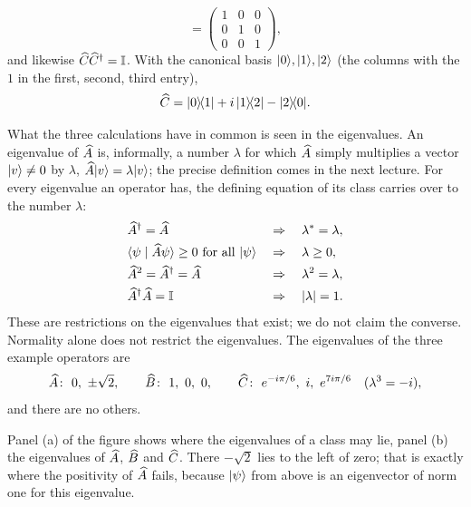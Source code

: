 \begin{example}
\begin{equation}
		= \begin{pmatrix} 1 & 0 & 0 \\ 0 & 1 & 0 \\ 0 & 0 & 1 \end{pmatrix},
	\end{equation}
	and likewise $\widehat{C}\widehat{C}^{\dagger} = \mathbb{I}$. With the canonical basis $\lvert 0 \rangle,\lvert 1 \rangle,\lvert 2 \rangle$ (the columns with the $1$ in the first, second, third entry),
	\begin{equation}
		\widehat{C} = \lvert 0 \rangle\!\langle 1 \rvert + i\,\lvert 1 \rangle\!\langle 2 \rvert - \lvert 2 \rangle\!\langle 0 \rvert.
	\end{equation}
\end{example}

What the three calculations have in common is seen in the eigenvalues. An eigenvalue of $\widehat{A}$ is, informally, a number $\lambda$ for which $\widehat{A}$ simply multiplies a vector $\lvert v \rangle \neq 0$ by $\lambda$, $\widehat{A}\lvert v \rangle = \lambda\lvert v \rangle$; the precise definition comes in the next lecture. For every eigenvalue an operator has, the defining equation of its class carries over to the number $\lambda$:
\begin{equation}
	\begin{aligned}
		&\widehat{A}^{\dagger} = \widehat{A} &&\Rightarrow\quad \lambda^* = \lambda, \\
		&\langle \psi \mid \widehat{A}\psi \rangle \geq 0 \text{ for all } \lvert \psi \rangle &&\Rightarrow\quad \lambda \geq 0, \\
		&\widehat{A}^2 = \widehat{A}^{\dagger} = \widehat{A} &&\Rightarrow\quad \lambda^2 = \lambda, \\
		&\widehat{A}^{\dagger}\widehat{A} = \mathbb{I} &&\Rightarrow\quad \left\lvert \lambda \right\rvert = 1.
	\end{aligned}
\end{equation}
These are restrictions on the eigenvalues that exist; we do not claim the converse. Normality alone does not restrict the eigenvalues. The eigenvalues of the three example operators are
\begin{equation}
	\widehat{A}\colon\ 0,\ \pm \sqrt{2}, \qquad
	\widehat{B}\colon\ 1,\ 0,\ 0, \qquad
	\widehat{C}\colon\ e^{-i\pi/6},\ i,\ e^{7i\pi/6} \quad (\lambda^3 = -i),
\end{equation}
and there are no others.




Panel (a) of the figure shows where the eigenvalues of a class may lie, panel (b) the eigenvalues of $\widehat{A}$, $\widehat{B}$ and $\widehat{C}$. There $-\sqrt{2}$ lies to the left of zero; that is exactly where the positivity of $\widehat{A}$ fails, because $\lvert \psi \rangle$ from above is an eigenvector of norm one for this eigenvalue.
